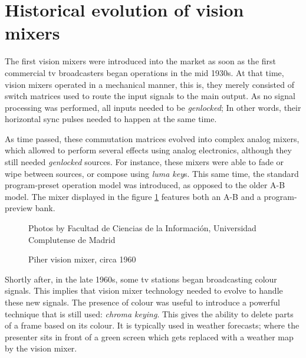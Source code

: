 \documentclass[../main.tex]{subfiles}
\begin{document}
\label{chap:soa}

\section{Historical evolution of vision mixers}
The first vision mixers were introduced into the market as soon as the first commercial \gls{tv} broadcasters began operations in the mid 1930s. At that time, vision mixers operated in a mechanical manner, this is, they merely consisted of switch matrices used to route the input signals to the main output. As no signal processing was performed, all inputs needed to be \textit{genlocked}; In other words, their horizontal sync pulses needed to happen at the same time\cite{becg2020}.\newline

As time passed, these commutation matrices evolved into complex analog mixers, which allowed to perform several effects using analog electronics, although they still needed \textit{genlocked} sources. For instance, these mixers were able to fade or wipe between sources, or compose using \textit{luma key}s\cite{WardPeter2001Saob}. This same time, the standard program-preset operation model was introduced, as opposed to the older A-B model. The mixer displayed in the figure \ref{fig:02:piher} features both an A-B and a program-preview bank.\newline

\begin{figure}[htbp]
    \centering
    
    \footnotesize{Photos by Facultad de Ciencias de la Información, Universidad Complutense de Madrid}
    \caption{Piher vision mixer, circa 1960}
    \label{fig:02:piher}
\end{figure}

Shortly after, in the late 1960s, some \gls{tv} stations began broadcasting colour signals. This implies that vision mixer technology needed to evolve to handle these new signals. The presence of colour was useful to introduce a powerful technique that is still used: \textit{chroma keying}\cite{jpeters}\cite{tmMixerHistory}. This gives the ability to delete parts of a frame based on its colour. It is typically used in weather forecasts; where the presenter sits in front of a green screen which gets replaced with a weather map by the vision mixer.\newline
\end{document}
